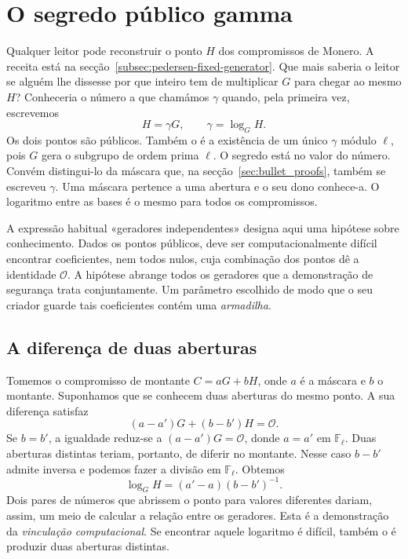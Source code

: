 \chapter{O segredo público gamma}
\label{chapter:dlog-relations}
\label{page:dlog-relations-start}

Qualquer leitor pode reconstruir o ponto \(H\) dos compromissos de
Monero. A receita está na secção~\ref{subsec:pedersen-fixed-generator}.
Que mais saberia o leitor se alguém lhe dissesse por que inteiro tem de
multiplicar \(G\) para chegar ao mesmo \(H\)? Conheceria o número a que
chamámos \(\gamma\) quando, pela primeira vez, escrevemos
\[
                    H=\gamma G,\qquad \gamma=\log_G H .
\]
Os dois pontos são públicos. Também o é a existência de um único
\(\gamma\) módulo \(\ell\), pois \(G\) gera o subgrupo de ordem prima
\(\ell\). O segredo está no valor do número. Convém distingui-lo da
máscara que, na secção~\ref{sec:bullet_proofs}, também se escreveu
\(\gamma\). Uma máscara pertence a uma abertura e o seu dono conhece-a.
O logaritmo entre as bases é o mesmo para todos os compromissos.

A expressão habitual «geradores independentes» designa aqui
uma hipótese sobre conhecimento. Dados os pontos públicos, deve ser
computacionalmente difícil encontrar coeficientes, nem todos nulos,
cuja combinação dos pontos dê a identidade \(\mathcal O\).
A hipótese abrange todos os geradores que a demonstração de segurança
trata conjuntamente. Um parâmetro escolhido de modo que o seu criador
guarde tais coeficientes contém uma \emph{armadilha}.

\section{A diferença de duas aberturas}

Tomemos o compromisso de montante \(C=aG+bH\), onde \(a\) é a máscara
e \(b\) o montante. Suponhamos que se conhecem duas aberturas do mesmo
ponto. A sua diferença satisfaz
\[
          (a-a')G+(b-b')H=\mathcal O .
\]
Se \(b=b'\), a igualdade reduz-se a \((a-a')G=\mathcal O\), donde
\(a=a'\) em \(\mathbb F_\ell\). Duas aberturas distintas teriam,
portanto, de diferir no montante. Nesse caso \(b-b'\) admite inversa
e podemos fazer a divisão em \(\mathbb F_\ell\). Obtemos
\[
                  \log_G H=(a'-a)(b-b')^{-1}.
\]
Dois pares de números que abrissem o ponto para valores diferentes
dariam, assim, um meio de calcular a relação entre os geradores.
Esta é a demonstração
da \emph{vinculação computacional}. Se encontrar aquele logaritmo é
difícil, também o é produzir duas aberturas distintas.

